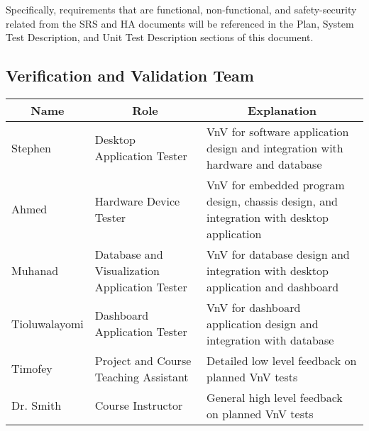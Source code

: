 \documentclass[12pt, titlepage]{article}
\begin{document}
  Specifically, requirements that are functional, non-functional, and safety-security related from the SRS and HA documents will be referenced in the Plan, System Test Description, and Unit Test Description sections of this document.\\

\subsection{Verification and Validation Team}


  \begin{table}[H]
    \centering
    \begin{tabular}{|p{3cm}|p{4cm}|p{7cm}|}
    \hline
    \multicolumn{1}{|c|}{\textbf{Name}} & \multicolumn{1}{|c|}{\textbf{Role}} & \multicolumn{1}{|c|}{\textbf{Explanation}}
    \\ \hline
    Stephen
    & Desktop Application Tester
    & VnV for software application design and integration with hardware and database
    \newline                                
    \\ \hline
  
    Ahmed                              
    & Hardware Device Tester
    & VnV for embedded program design, chassis design, and integration with desktop application
    \newline                                
    \\ \hline
  
    Muhanad                          
    & Database and Visualization Application Tester
    & VnV for database design and integration with desktop application and dashboard
    \newline                                
    \\ \hline
  
    Tioluwalayomi                                
    & Dashboard Application Tester
    & VnV for dashboard application design and integration with database
    \newline                            
    \\ \hline

    Timofey                                
    & Project and Course Teaching Assistant
    & Detailed low level feedback on planned VnV tests
    \newline                            
    \\ \hline
  
    Dr. Smith                                
    & Course Instructor
    & General high level feedback on planned VnV tests 
    \newline                            
    \\ \hline
  
    \end{tabular}
  \end{table}
  \newpage
\end{document}
